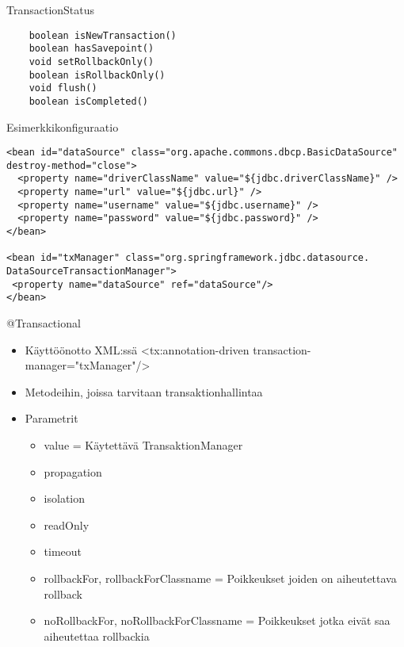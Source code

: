 \documentclass[hyperref={pdfauthor=\AUTHOR},14pt]{beamer}
\begin{document}
\begin{frame}[t, fragile]{TransactionStatus}
\lstset{language=Java,style=Java}
\begin{lstlisting}    
    boolean isNewTransaction()
    boolean hasSavepoint()
    void setRollbackOnly()
    boolean isRollbackOnly()
    void flush()
    boolean isCompleted()
\end{lstlisting}

\end{frame}

\begin{frame}[t, fragile]{Esimerkkikonfiguraatio}

\begin{lstlisting}
<bean id="dataSource" class="org.apache.commons.dbcp.BasicDataSource" destroy-method="close">
  <property name="driverClassName" value="${jdbc.driverClassName}" />
  <property name="url" value="${jdbc.url}" />
  <property name="username" value="${jdbc.username}" />
  <property name="password" value="${jdbc.password}" />
</bean>

<bean id="txManager" class="org.springframework.jdbc.datasource.
DataSourceTransactionManager">
 <property name="dataSource" ref="dataSource"/>
</bean>
\end{lstlisting}
\end{frame}

\begin{frame}[t, fragile]{@Transactional}
\begin{itemize}
\item Käyttöönotto XML:ssä <tx:annotation-driven transaction-manager="txManager"/>
\item Metodeihin, joissa tarvitaan transaktionhallintaa
\item Parametrit
\begin{itemize}
\item value = Käytettävä TransaktionManager
\item propagation
\item isolation
\item readOnly
\item timeout
\item rollbackFor, rollbackForClassname = Poikkeukset joiden on aiheutettava rollback
\item noRollbackFor, noRollbackForClassname =  Poikkeukset jotka eivät saa aiheutettaa rollbackia

\end{itemize}
\end{itemize}
\end{frame}
\end{document}

